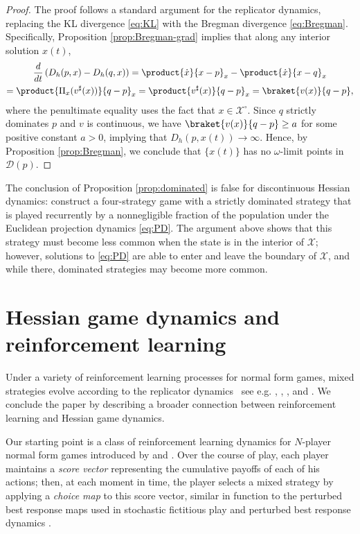 \documentclass[reqno]{amsart}
\theoremstyle{plain}
\theoremstyle{definition}
\theoremstyle{remark}
\numberwithin{equation}{section}
\numberwithin{theorem}{section}
\begin{document}
\begin{proof}
The proof follows a standard argument for the replicator dynamics, replacing the \ac{KL} divergence \eqref{eq:KL} with the Bregman divergence \eqref{eq:Bregman}.
Specifically,
Proposition \ref{prop:Bregman-grad} implies that along any interior solution $x(t)$,
\begin{multline}
\label{eq:DSProof}
\frac{d}{dt}\left({D_{h}}(p,x) - {D_{h}}(q,x)\right)
	= \product{\dot x}{x - p}_{x} - \product{\dot x}{x - q}_{x}
	\\
	= \product{\operatorname{\Pi}_{x}({v}^{\sharp}(x))}{q - p}_{x}
	= \product{{v}^{\sharp}(x)}{q-p}_x
	= \braket{{v}(x)}{q-p},
\end{multline}
where the penultimate equality uses the fact that $x\in{{\mathcal{X}}^{\circ}}$.
Since $q$ strictly dominates $p$ and ${v}$ is continuous, we have $\braket{{v}(x)}{q-p} \geq a$ for some positive constant $a>0$, implying that ${D_{h}}(p,x(t))\to\infty$.
Hence, by Proposition \ref{prop:Bregman}, we conclude that $\{x(t)\}$ has no $\omega$-limit points in ${\mathcal{D}}(p)$.
\end{proof}

The conclusion of Proposition \ref{prop:dominated} is false for discontinuous Hessian dynamics:
\cite{SDL08} construct a four-strategy game with a strictly dominated strategy that is played recurrently by a nonnegligible fraction of the population under the Euclidean projection dynamics \eqref{eq:PD}.
The argument above shows that this strategy must become less common when the state is in the interior of ${\mathcal{X}}$;
however, solutions to \eqref{eq:PD} are able to enter and leave the boundary of ${\mathcal{X}}$, and while there, dominated strategies may become more common.

\section{Hessian game dynamics and reinforcement learning}
\label{sec:RL}

Under a variety of reinforcement learning processes for normal form games, mixed strategies evolve according to the replicator dynamics \textendash\ see e.g. \cite{BS97}, \cite{Pos97}, \cite{Rus99}, \cite{Hop02} and \cite{HSV09}.
We conclude the paper by describing a broader connection between reinforcement learning and Hessian game dynamics.

Our starting point is a class of reinforcement learning dynamics for $N$-player normal form games introduced by \cite{CGM15} and \cite{MS16}.
Over the course of play, each player maintains a \emph{score vector} representing the cumulative payoffs of each of his actions;
then, at each moment in time, the player selects a mixed strategy by applying a \emph{choice map} to this score vector, similar in function to the perturbed best response maps used in stochastic fictitious play and perturbed best response dynamics \citep{FL98,HS02,HS07}.
\end{document}
